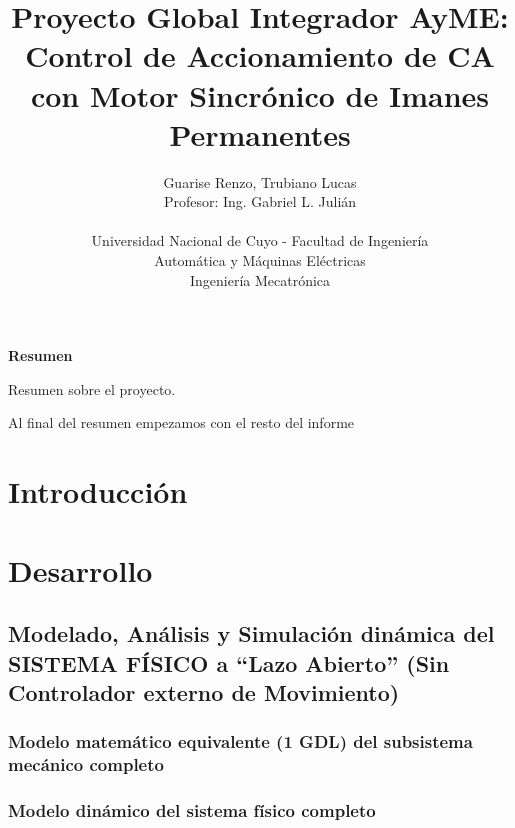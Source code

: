\documentclass[10pt]{article}
\title{Proyecto Global Integrador AyME:\\
Control de Accionamiento de CA con Motor Sincrónico de Imanes Permanentes}
\author{Guarise Renzo, Trubiano Lucas\\
Profesor: Ing. Gabriel L. Julián\\
\\
Universidad Nacional de Cuyo - Facultad de Ingeniería\\
Automática y Máquinas Eléctricas\\
Ingeniería Mecatrónica}
\begin{document}
\maketitle

\begin{center} %
    {\Large \textbf{Resumen}}
\end{center}

Resumen sobre el proyecto.

Al final del resumen empezamos con el resto del informe

\newpage


\section{Introducción}

\section{Desarrollo}
\subsection{Modelado, Análisis y Simulación dinámica del SISTEMA FÍSICO a “Lazo Abierto” (Sin Controlador externo de Movimiento)}
\subsubsection{Modelo matemático equivalente (1 GDL) del subsistema mecánico completo}
\subsubsection{Modelo dinámico del sistema físico completo}
\end{document}

